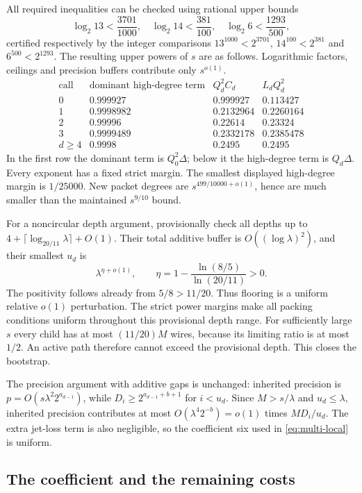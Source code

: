All required inequalities can be checked using rational upper bounds
\[
 \log_2 13<\frac{3701}{1000},\quad
 \log_2 14<\frac{381}{100},\quad
 \log_2 6<\frac{1293}{500},
\]
certified respectively by the integer comparisons
$13^{1000}<2^{3701}$, $14^{100}<2^{381}$ and $6^{500}<2^{1293}$.
The resulting upper powers of $s$ are as follows.  Logarithmic factors,
ceilings and precision buffers contribute only $s^{o(1)}$.
\[
\begin{array}{c|c|c|c}
\text{call}&\text{dominant high-degree term}&Q_d^2C_d&L_dQ_d^2\\\hline
0&0.999927&0.999927&0.113427\\
1&0.9998982&0.2132964&0.2260164\\
2&0.99996&0.22614&0.23324\\
3&0.9999489&0.2332178&0.2385478\\
d\ge4&0.9998&0.2495&0.2495
\end{array}
\]
In the first row the dominant term is $Q_0^2\Delta$; below it the
high-degree term is $Q_d\Delta$.  Every exponent has a fixed strict
margin.  The smallest displayed high-degree margin is $1/25000$.
New packet degrees are $s^{499/10000+o(1)}$, hence are much smaller
than the maintained $s^{9/10}$ bound.

For a noncircular depth argument, provisionally check all depths up to
$4+\lceil\log_{20/11}\lambda\rceil+O(1)$.  Their total additive buffer
is $O((\log\lambda)^2)$, and their smallest $u_d$ is
\[
 \lambda^{\eta+o(1)},\qquad
 \eta=1-\frac{\ln(8/5)}{\ln(20/11)}>0.
\]
The positivity follows already from $5/8>11/20$.  Thus flooring is a
uniform relative $o(1)$ perturbation.  The strict power margins make
all packing conditions uniform throughout this provisional depth range.
For sufficiently large $s$ every child has at most $(11/20)M$ wires,
because its limiting ratio is at most $1/2$.  An active path therefore
cannot exceed the provisional depth.  This closes the bootstrap.

The precision argument with additive gaps is unchanged: inherited
precision is $p=O(s\lambda^2 2^{a_{d-1}})$, while
$D_i\ge2^{a_{d-1}+b+1}$ for $i<u_d$.  Since $M>s/\lambda$ and
$u_d\le\lambda$, inherited precision contributes at most
$O(\lambda^4 2^{-b})=o(1)$ times $MD_i/u_d$.  The extra jet-loss term
is also negligible, so the coefficient six used in
\eqref{eq:multi-local} is uniform.

\subsection{The coefficient and the remaining costs}

